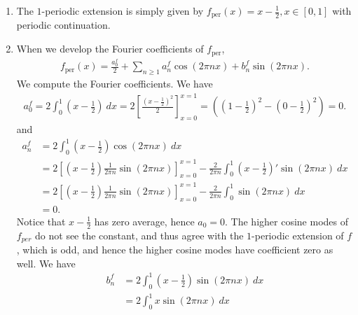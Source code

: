 \documentclass[11pt]{article}
\begin{document}
\begin{solution}
    \begin{enumerate}
        \item The $1$-periodic extension is simply given by $f_{\text{per}}(x) = x - \frac 1 2, x \in [0, 1]$ with periodic continuation.
        \item When we develop the Fourier coefficients of $f_{\text{per}}$, 
        \begin{align*}
            f_{\text{per}}(x) = \frac{a^{f}_0}{2} + \sum_{n \geq 1} a^{f}_{n} \cos( 2 \pi n x ) + b^{f}_{n} \sin( 2 \pi n x ).
        \end{align*}
        We compute the Fourier coefficients.
        We have 
        \begin{align*}
            a^{f}_{0} 
            = 
            2 \int_{0}^{1} (x-\tfrac 1 2 ) \ dx 
            = 
            2 \left[ \frac{(x-\tfrac 1 2)^{2}}{2} \right]_{x=0}^{x=1}
            =
            \left( (1-\tfrac 1 2)^{2} - (0-\tfrac 1 2)^{2} \right)
            =
            0
            .
        \end{align*}
        and 
        \begin{align*}
            a^{f}_n 
            &= 
            2\int_{0}^{1} \left( x- \frac 1 2 \right) \cos(2 \pi n x) \ dx 
            \\&= 
            2\left[ \left( x- \frac 1 2 \right) \frac{1}{2 \pi n} \sin(2 \pi n x) \right]_{x=0}^{x=1}
            -
            \frac{2}{2 \pi n} \int_{0}^{1} \left( x- \frac 1 2 \right)' \sin(2 \pi n x) \ dx 
            \\&= 
            2\left[ \left( x- \frac 1 2 \right) \frac{1}{2 \pi n} \sin(2 \pi n x) \right]_{x=0}^{x=1}
            -
            \frac{2}{2 \pi n} \int_{0}^{1} \sin(2 \pi n x) \ dx 
            \\&
            =
            0
            .
        \end{align*}
        Notice that $x-\tfrac 1 2$ has zero average, hence $a_0 = 0$.
        The higher cosine modes of $f_{per}$ do not see the constant, and thus agree with the $1$-periodic extension of $f$, which is odd, and hence the higher cosine modes have coefficient zero as well. 
        We have 
        \begin{align*}
            b^{f}_n 
            &= 
            2 
            \int_{ 0}^{1} \left( x- \frac 1 2 \right) \sin(2 \pi n x) \ dx 
            \\&= 
            2 
            \int_{ 0}^{1} x \sin(2 \pi n x) \ dx 

\end{align*}
\end{enumerate}
\end{solution}
\end{document}
